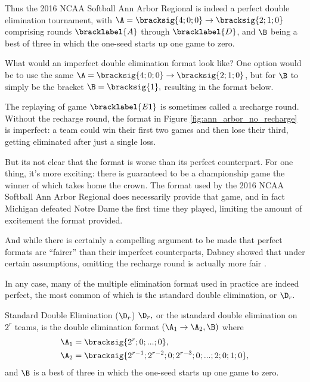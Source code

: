 {    Thus the 2016 NCAA Softball Ann Arbor Regional is indeed a perfect double elimination tournament, with $\A = \bracksig{4;0;0} \to \bracksig{2;1;0}$ comprising rounds $\bracklabel{A}$ through $\bracklabel{D}$, and $\B$ being a best of three in which the one-seed starts up one game to zero.

    What would an imperfect double elimination format look like? One option would be to use the same $\A = \bracksig{4;0;0} \to \bracksig{2;1;0}$, but for $\B$ to simply be the bracket $\B = \bracksig{1},$ resulting in the format below.


    The replaying of game $\bracklabel{E1}$ is sometimes called a \i{recharge round}. Without the recharge round, the format in Figure \ref{fig:ann_arbor_no_recharge} is imperfect: a team could win their first two games and then lose their third, getting eliminated after just a single loss.

    But its not clear that the format is worse than its perfect counterpart. For one thing, it's more exciting: there is guaranteed to be a championship game the winner of which takes home the crown. The  format used by the 2016 NCAA Softball Ann Arbor Regional does necessarily provide that game, and in fact Michigan defeated Notre Dame the first time they played, limiting the amount of excitement the format provided.

    And while there is certainly a compelling argument to be made that perfect formats are ``fairer'' than their imperfect counterparts, Dabney showed that under certain assumptions, omitting the recharge round is actually more fair \cite{recharge_rounds}.

    In any case, many of the multiple elimination format used in practice are indeed perfect, the most common of which is the \i{standard double elimination}, or $\D_r.$

    \begin{definition}{Standard Double Elimination ($\D_r$)}{}
        $\D_r,$ or the \i{standard double elimination on $2^r$ teams}, is the double elimination format $(\A_1 \to \A_2, \B)$ where
        \begin{align*}
            \A_1 &= \bracksig{2^r; 0; ... ; 0},\\
            \A_2 &= \bracksig{2^{r-1}; 2^{r-2}; 0; 2^{r-3}; 0; ...; 2; 0; 1; 0},
        \end{align*}
        and $\B$ is a best of three in which the one-seed starts up one game to zero.
    \end{definition}

}

